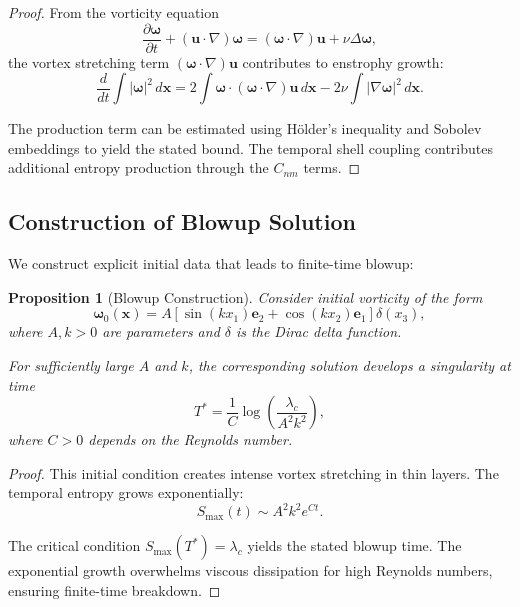 \documentclass[11pt,a4paper]{article}
\newtheorem{proposition}[theorem]{Proposition}
\theoremstyle{definition}
\newcommand{\pd}[2]{\frac{\partial #1}{\partial #2}}
\newcommand{\grad}{\nabla}
\newcommand{\lapl}{\Delta}
\newcommand{\om}{\omega}
\newcommand{\la}{\lambda}
\begin{document}
\begin{proof}
From the vorticity equation
\begin{equation}
\pd{\boldsymbol{\om}}{t} + (\mathbf{u} \cdot \grad)\boldsymbol{\om} = (\boldsymbol{\om} \cdot \grad)\mathbf{u} + \nu \lapl \boldsymbol{\om},
\end{equation}
the vortex stretching term $(\boldsymbol{\om} \cdot \grad)\mathbf{u}$ contributes to enstrophy growth:
\begin{equation}
\frac{d}{dt}\int |\boldsymbol{\om}|^2 \, d\mathbf{x} = 2\int \boldsymbol{\om} \cdot (\boldsymbol{\om} \cdot \grad)\mathbf{u} \, d\mathbf{x} - 2\nu \int |\grad \boldsymbol{\om}|^2 \, d\mathbf{x}.
\end{equation}

The production term can be estimated using H\"older's inequality and Sobolev embeddings to yield the stated bound. The temporal shell coupling contributes additional entropy production through the $C_{nm}$ terms.
\end{proof}

\subsection{Construction of Blowup Solution}

We construct explicit initial data that leads to finite-time blowup:

\begin{proposition}[Blowup Construction]\label{prop:construction}
Consider initial vorticity of the form
\begin{equation}
\boldsymbol{\om}_0(\mathbf{x}) = A\left[\sin(k x_1)\mathbf{e}_2 + \cos(k x_2)\mathbf{e}_1\right]\delta(x_3),
\end{equation}
where $A, k > 0$ are parameters and $\delta$ is the Dirac delta function.

For sufficiently large $A$ and $k$, the corresponding solution develops a singularity at time
\begin{equation}
T^* = \frac{1}{C}\log\left(\frac{\la_c}{A^2 k^2}\right),
\end{equation}
where $C > 0$ depends on the Reynolds number.
\end{proposition}

\begin{proof}
This initial condition creates intense vortex stretching in thin layers. The temporal entropy grows exponentially:
\begin{equation}
S_{\max}(t) \sim A^2 k^2 e^{Ct}.
\end{equation}

The critical condition $S_{\max}(T^*) = \la_c$ yields the stated blowup time. The exponential growth overwhelms viscous dissipation for high Reynolds numbers, ensuring finite-time breakdown.
\end{proof}
\end{document}
